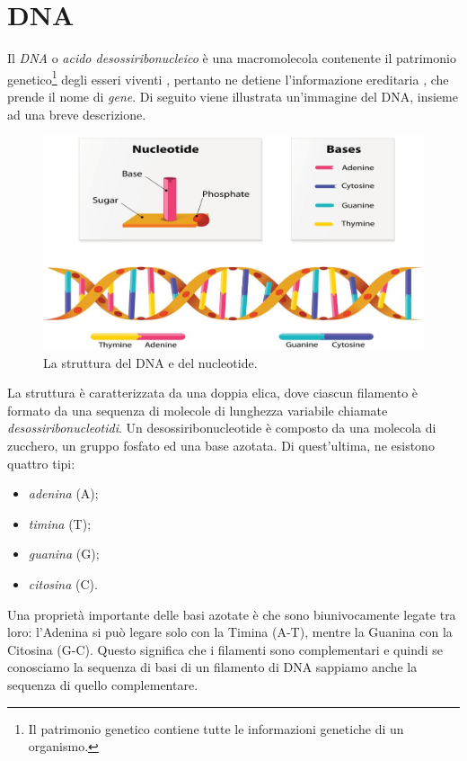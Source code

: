 \section{DNA}
Il \textit{DNA} o \textit{acido desossiribonucleico} è una macromolecola contenente il patrimonio genetico\footnote{Il patrimonio genetico contiene tutte le informazioni genetiche di un organismo.} degli esseri viventi \cite{campbellBiology}, pertanto ne detiene l'informazione ereditaria \cite{BiologySolomon}, che prende il nome di \textit{gene}.
\newline
Di seguito viene illustrata un'immagine del DNA, insieme ad una breve descrizione.
\newline
\begin{figure}[h!]
	\includegraphics[width=\linewidth]{DNAStructure.jpg}
 	\caption{La struttura del DNA e del nucleotide.}
  	\label{fig:DnaAndNucleotideStructure}
\end{figure}
\newline
La struttura è caratterizzata da una doppia elica, dove ciascun filamento è formato da una sequenza di molecole di lunghezza variabile chiamate \textit{desossiribonucleotidi}.
\newline
Un desossiribonucleotide è composto da una molecola di zucchero, un gruppo fosfato ed una base azotata. Di quest'ultima, ne esistono quattro tipi:
\begin{itemize}
	\item \textit{adenina} (A);
	\item \textit{timina} (T);
	\item \textit{guanina} (G);
	\item \textit{citosina} (C).
\end{itemize}
Una proprietà importante delle basi azotate è che sono biunivocamente legate tra loro: l'Adenina si può legare solo con la Timina (A-T), mentre la Guanina con la Citosina (G-C). Questo significa che i filamenti sono complementari e quindi se conosciamo la sequenza di basi di un filamento di DNA sappiamo anche la sequenza di quello complementare.

